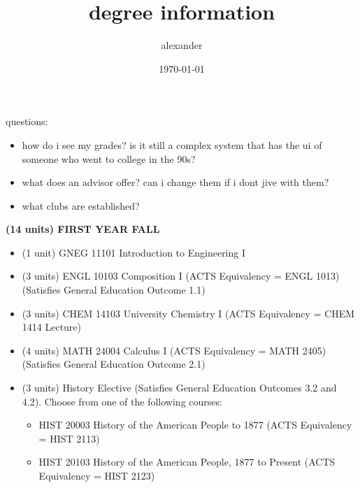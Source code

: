\documentclass{article}
\title{degree information}
\date{\today}
\author{alexander}
\begin{document}
\maketitle

questions:
	\begin{itemize}
		\item how do i see my grades? is it still a complex system that has the ui of someone who went to college in the 90s? 
		\item what does an advisor offer? can i change them if i dont jive with them?
		\item what clubs are established?
	\end{itemize}

\textbf{(14 units) FIRST YEAR FALL}
	\begin{itemize}
		\item (1 unit) GNEG 11101 Introduction to Engineering I
		\item (3 units) ENGL 10103 Composition I (ACTS Equivalency = ENGL 1013) (Satisfies General Education Outcome 1.1)
		\item (3 units) CHEM 14103 University Chemistry I (ACTS Equivalency = CHEM 1414 Lecture)
		\item (4 units) MATH 24004 Calculus I (ACTS Equivalency = MATH 2405) (Satisfies General Education Outcome 2.1)
		\item (3 units) History Elective (Satisfies General Education Outcomes 3.2 and 4.2). Choose from one of the following courses:
			\begin{itemize}
				\item HIST 20003 History of the American People to 1877 (ACTS Equivalency = HIST 2113)
				\item HIST 20103 History of the American People, 1877 to Present (ACTS Equivalency = HIST 2123)
			\end{itemize}
	\end{itemize}
\end{document}
